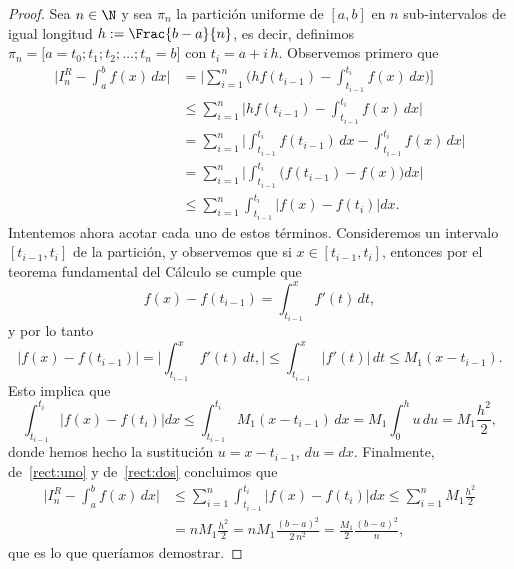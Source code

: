 
\begin{proof}
 Sea $n \in \N$ y sea $\pi_n$ la partición uniforme de $[a,b]$ en $n$ sub-intervalos de igual longitud $h := \Frac{b-a}{n}$, es decir, definimos $\pi_n = \big[a = t_0; t_1; t_2; \dots ; t_n = b\big]$ con $t_i = a + i\, h$. Observemos primero que
\begin{equation}\label{rect:uno}
\begin{aligned}
 \Big| I_n^R - \int_a^b f(x) \, dx \Big|
&=  \bigg| \sum_{i=1}^n \Big( h f(t_{i-1}) - \int_{t_{i-1}}^{t_i} f(x)\, dx \Big) \bigg] 
\\
&\le  \sum_{i=1}^n \Big| h f(t_{i-1}) - \int_{t_{i-1}}^{t_i} f(x)\, dx \Big|
\\
&=    \sum_{i=1}^n \Big| \int_{t_{i-1}}^{t_i} f(t_{i-1}) \, dx - \int_{t_{i-1}}^{t_i} f(x)\, dx \Big|
\\
&=    \sum_{i=1}^n \Big| \int_{t_{i-1}}^{t_i} \big( f(t_{i-1}) - f(x) \big) dx \Big|
\\
&\le    \sum_{i=1}^n   \int_{t_{i-1}}^{t_i} \big| f(x) - f(t_i) \big| dx .
\end{aligned}
\end{equation}
Intentemos ahora acotar cada uno de estos términos. Consideremos un intervalo $[t_{i-1}, t_i]$ de la partición, y observemos que si $x \in [t_{i-1}, t_i]$, entonces por el teorema fundamental del Cálculo se cumple que
\[
 f(x) - f(t_{i-1}) = \int_{t_{i-1}}^x f'(t)\, dt,
\]
y por lo tanto
\[
\big| f(x) - f(t_{i-1}) \big| = \Big| \int_{t_{i-1}}^x f'(t)\, dt, \Big|
\le \int_{t_{i-1}}^x |f'(t)| \, dt \le M_1 (x - t_{i-1}).
\]
Esto implica que
\begin{equation}\label{rect:dos}
  \int_{t_{i-1}}^{t_i} \big| f(x) - f(t_i) \big| dx  \le \int_{t_{i-1}}^{t_i} M_1 (x-t_{i-1}) \, dx
= M_1 \int_0^h u \, du = M_1 \frac{h^2}{2},
\end{equation}
donde hemos hecho la sustitución $u = x - t_{i-1}$, $du = dx$. Finalmente, de~\eqref{rect:uno} y de~\eqref{rect:dos} concluimos que
\begin{align*}
 \Big| I_n^R - \int_a^b f(x) \, dx \Big|
&\le   \sum_{i=1}^n   \int_{t_{i-1}}^{t_i} \big| f(x) - f(t_i) \big| dx 
\le \sum_{i=1}^n M_1 \frac{h^2}{2} 
\\
&= n M_1 \frac{h^2}{2} = n M_1 \frac{(b-a)^2}{2 \, n^2} = \frac{M_1}2 \frac{(b-a)^2}{n},
\end{align*}
que es lo que queríamos demostrar.
\end{proof}

